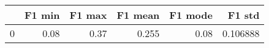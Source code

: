 \begin{tabular}{lrrrrr}
\toprule
{} &  F1 min &  F1 max &  F1 mean &  F1 mode &    F1 std \\
\midrule
0 &    0.08 &    0.37 &    0.255 &     0.08 &  0.106888 \\
\bottomrule
\end{tabular}
